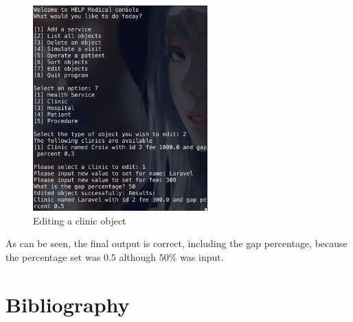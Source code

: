 \documentclass{article}
\begin{document}
	\begin{figure}
		\begin{center}
			\includegraphics[width=0.6\textwidth]{figures/Editing/Editing_01.png}
		\end{center}
		\caption{Editing a clinic object}\label{fig:editing_01}
	\end{figure}

	As can be seen, the final output is correct, including the gap percentage, because the percentage set was $0.5$ although $50\%$ was input.

	\section{Bibliography}\label{sec:bibliography} %
	\printbibliography
\end{document}
